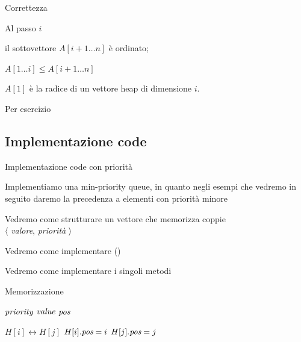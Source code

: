 \begin{frame}{Correttezza}
    
\vspace{-9pt}
\begin{myboxtitle}
\smallskip
Al passo $i$
\BIL
\item il sottovettore $A[i+1 \ldots n]$ è ordinato; 
\item $A[1 \ldots i] \leq A[i+1 \ldots n]$ 
\item $A[1]$ è la radice di un vettore heap di dimensione $i$.
\EIL
\end{myboxtitle}

\begin{myboxtitle}[Dimostrazione]
\smallskip
Per esercizio
\end{myboxtitle}

\end{frame}


\subsection{Implementazione code}

\begin{frame}{Implementazione code con priorità}

\vspace{-9pt}
Implementiamo una min-priority queue, in quanto negli esempi che vedremo
in seguito daremo la precedenza a elementi con priorità minore

\BIL
\item Vedremo come strutturare un vettore che memorizza coppie\\
  $\langle$ \textit{valore}, \textit{priorità} $\rangle$
\item Vedremo come implementare \minheapify()
\item Vedremo come implementare i singoli metodi
\EIL

\end{frame}

\begin{frame}{Memorizzazione}

\vspace{-9pt}
\begin{Procedure}
\caption[A]{\PriorityItem}

\INTEGER $\textit{priority}$
\Item $\textit{value}$
\INTEGER $\textit{pos}$

\end{Procedure}

\begin{Procedure}
\caption[A]{\Swap($\PriorityItem[\,]$ $H$, \INTEGER $i$, \INTEGER $j$)}

$H[i] \leftrightarrow H[j]$\;
$H[i].\textit{pos} = i$\;
$H[j].\textit{pos} = j$\;

\end{Procedure}

\end{frame}

